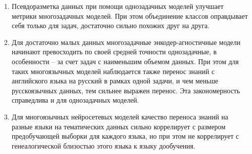 {}
\begin{enumerate}
  \item {Псевдоразметка данных при помощи однозадачных моделей улучшает метрики многозадачных моделей. При этом объединение классов оправдывает себя только для задач, достаточно сильно похожих друг на друга.}
  \item {Для достаточно малых данных многозадачные энкодер-агностичные модели начинают превосходить по своей средней точности однозадачные, в особенности -- за счет задач с наименьшим объемом данных. При этом для таких многоязычных моделей наблюдается также перенос знаний с английского языка на русский в рамках одной задачи, и чем меньше русскоязычных данных, тем сильнее выражен перенос. Эта закономерность справедлива и для однозадачных моделей.}
  \item {Для многоязычных нейросетевых моделей качество переноса знаний на разные языки на тематических данных сильно коррелирует с размером предобучающей выборки для каждого языка, но при этом не коррелирует с генеалогической близостью этого языка к языку дообучения.}
\end{enumerate}


\iffalse
Направления исследований 1.2.2:
1. Разработка новых математических методов моделирования объектов и
явлений (физико-математические науки).
2. Разработка, обоснование и тестирование эффективных вычислительных
методов с применением современных компьютерных технологий.
3. Реализация эффективных численных методов и алгоритмов в виде
комплексов проблемно-ориентированных программ для проведения
вычислительного эксперимента.
4. Разработка новых математических методов и алгоритмов интерпретации
натурного эксперимента на основе его математической модели.
5. Разработка новых математических методов и алгоритмов валидации
математических моделей объектов на основе данных натурного эксперимента
или на основе анализа математических моделей.
6. Разработка систем компьютерного и имитационного моделирования,
алгоритмов и методов имитационного моделирования на основе анализа
математических моделей (технические науки).
7. Качественные или аналитические методы исследования математических
моделей (технические науки).
8. Комплексные исследования научных и технических проблем с
применением современной технологии математического моделирования и
вычислительного эксперимента.
9. Постановка и проведение численных экспериментов, статистический
анализ их результатов, в том числе с применением современных
компьютерных технологий (технические науки).
\fi


